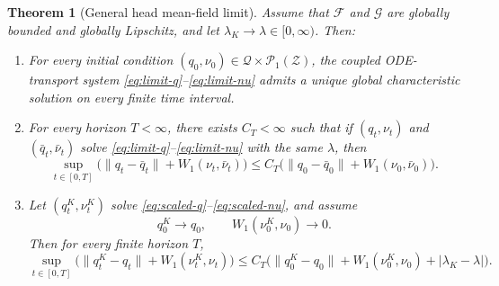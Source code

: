 \documentclass{article}
\newtheorem{theorem}{Theorem}
\theoremstyle{definition}
\newcommand{\PP}{\mathcal{P}}
\newcommand{\W}{W_1}
\begin{document}
\begin{theorem}[General head mean-field limit]
\label{thm:head-mf}
Assume that $\mathcal F$ and $\mathcal G$ are globally bounded and globally Lipschitz, and let $\lambda_K\to\lambda\in[0,\infty)$. Then:
\begin{enumerate}[leftmargin=2em]
  \item For every initial condition $(q_0,\nu_0)\in\mathcal Q\times\PP_1(\mathcal Z)$, the coupled ODE-transport system \eqref{eq:limit-q}--\eqref{eq:limit-nu} admits a unique global characteristic solution on every finite time interval.
  \item For every horizon $T<\infty$, there exists $C_T<\infty$ such that if $(q_t,\nu_t)$ and $(\bar q_t,\bar\nu_t)$ solve \eqref{eq:limit-q}--\eqref{eq:limit-nu} with the same $\lambda$, then
  \begin{equation}
    \sup_{t\in[0,T]}
    \bigl(
      \|q_t-\bar q_t\|+\W(\nu_t,\bar\nu_t)
    \bigr)
    \le
    C_T
    \bigl(
      \|q_0-\bar q_0\|+\W(\nu_0,\bar\nu_0)
    \bigr).
    \label{eq:head-mf-stability}
  \end{equation}
  \item Let $(q_t^K,\nu_t^K)$ solve \eqref{eq:scaled-q}--\eqref{eq:scaled-nu}, and assume
  \[
    q_0^K\to q_0,
    \qquad
    \W(\nu_0^K,\nu_0)\to 0.
  \]
  Then for every finite horizon $T$,
  \begin{equation}
    \sup_{t\in[0,T]}
    \bigl(
      \|q_t^K-q_t\|+\W(\nu_t^K,\nu_t)
    \bigr)
    \le
    C_T
    \bigl(
      \|q_0^K-q_0\|+\W(\nu_0^K,\nu_0)+|\lambda_K-\lambda|
    \bigr).
    \label{eq:head-mf-conv}
  \end{equation}
\end{enumerate}
\end{theorem}
\end{document}
